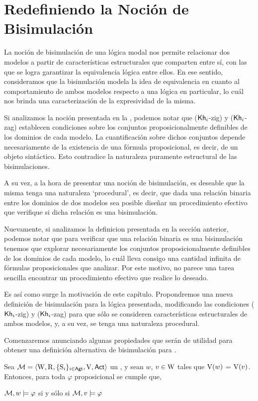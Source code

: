\chapter{Redefiniendo la Noción de Bisimulación}

La noción de bisimulación de una lógica modal nos permite relacionar dos modelos a partir de características estructurales 
que comparten entre sí, con las que se logra garantizar la equivalencia lógica entre ellos. En ese sentido, consideramos que la 
bisimulación modela la idea de equivalencia en cuanto al comportamiento de ambos modelos respecto a una lógica en particular, lo cuál nos brinda
una caracterización de la expresividad de la misma.

Si analizamos la noción presentada en la , podemos notar que ($\mathsf{Kh}_i$-zig) y ($\mathsf{Kh}_i$-zag) establecen condiciones 
sobre los conjuntos proposicionalmente definibles de los dominios de cada modelo. La cuantificación sobre dichos conjuntos depende necesariamente
de la existencia de una fórmula proposicional, es decir, de un objeto sintáctico. Esto contradice la naturaleza puramente estructural 
de las bisimulaciones. 

A su vez, a la hora de presentar una noción de bisimulación, es deseable que la misma tenga una naturaleza `procedural', es decir,
que dada una relación binaria entre los dominios de dos modelos sea posible diseñar un procedimiento efectivo que verifique si dicha relación 
es una bisimulación.

Nuevamente, si analizamos la definicion presentada en la sección anterior, podemos notar que para verificar que una relación binaria es una bisimulación
tenemos que explorar necesariamente los conjuntos proposicionalmente definibles de los dominios de cada modelo, lo cuál lleva consigo una cantidad 
infinita de fórmulas proposicionales que analizar. Por este motivo, no parece una tarea sencilla encontrar un procedimiento efectivo que realice lo deseado.

Es así como surge la motivación de este capítulo. Propondremos una nueva definición de bisimulación para la lógica presentada, modificando las condiciones
($\mathsf{Kh}_i$-zig) y ($\mathsf{Kh}_i$-zag) para que sólo se consideren características estructurales de ambos modelos, y, a su vez, se tenga una naturaleza procedural.

Comenzaremos anunciando algunas propiedades que serán de utilidad para obtener una definición alternativa de bisimulación para \KHilogic.

\begin{lema}\label{lema:propositional-equivalence}
    Sea $\mathcal{M}=\langle \mathrm{W},\mathrm{R},\{ \mathrm{S}_i \}_{i \in {\rm \sf Agt}},\mathrm{V},{\rm \sf Act} \rangle$ un \ults, y sean $w$, $v \in \mathrm{W}$
    tales que $\mathrm{V}(w)$ = $\mathrm{V}(v)$. Entonces, para toda $\varphi$ proposicional se cumple que, 
    \begin{center}
    $\mathcal{M}, w \models \varphi$ \quad si y sólo si \quad $ 
    \mathcal{M}, v \models \varphi$
    \end{center}
\end{lema}

